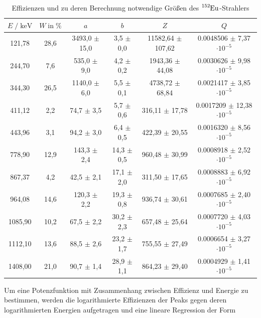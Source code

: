 \begin{table}
  \centering
  \caption{Effizienzen und zu deren Berechnung notwendige Größen des $\ce{^{152}Eu}$-Strahlers}
  \label{tab:mess2}
  \begin{tabular}{c c c c c c}
  \toprule
  $E \;/\; \si{\kilo\eV}$ & $W \;\text{in}\; \si{\percent}$ & $a$ & $b$ & $Z$ & $Q$ \\
  \midrule
        121,78 & 28,6 & 3493,0 $\pm$ 15,0 &  3,5 $\pm$ 0,0 & 11582,64 $\pm$ 107,62 & 0.0048506 $\pm$  7,37 $\cdot 10^{-5}$ \\
        244,70 &  7,6 &  535,0 $\pm$  9,0 &  4,2 $\pm$ 0,2 &  1943,36 $\pm$  44,08 & 0.0030626 $\pm$  9,98 $\cdot 10^{-5}$ \\
        344,30 & 26,5 & 1140,0 $\pm$  6,0 &  5,5 $\pm$ 0,1 &  4738,72 $\pm$  68,84 & 0.0021417 $\pm$  3,85 $\cdot 10^{-5}$ \\
        411,12 &  2,2 &   74,7 $\pm$  3,5 &  5,7 $\pm$ 0,6 &   316,11 $\pm$  17,78 & 0.0017209 $\pm$ 12,38 $\cdot 10^{-5}$ \\
        443,96 &  3,1 &   94,2 $\pm$  3,0 &  6,4 $\pm$ 0,5 &   422,39 $\pm$  20,55 & 0.0016320 $\pm$  8,56 $\cdot 10^{-5}$ \\
        778,90 & 12,9 &  143,3 $\pm$  2,4 & 14,3 $\pm$ 0,5 &   960,48 $\pm$  30,99 & 0.0008918 $\pm$  2,52 $\cdot 10^{-5}$ \\
        867,37 &  4,2 &   42,5 $\pm$  2,1 & 17,1 $\pm$ 2,0 &   311,50 $\pm$  17,65 & 0.0008883 $\pm$  6,92 $\cdot 10^{-5}$ \\
        964,08 & 14,6 &  120,3 $\pm$  2,2 & 19,3 $\pm$ 0,8 &   936,74 $\pm$  30,61 & 0.0007685 $\pm$  2,40 $\cdot 10^{-5}$ \\
       1085,90 & 10,2 &   67,5 $\pm$  2,2 & 30,2 $\pm$ 2,3 &   657,48 $\pm$  25,64 & 0.0007720 $\pm$  4,03 $\cdot 10^{-5}$ \\
       1112,10 & 13,6 &   88,5 $\pm$  2,6 & 23,2 $\pm$ 1,7 &   755,55 $\pm$  27,49 & 0.0006654 $\pm$  3,27 $\cdot 10^{-5}$ \\
       1408,00 & 21,0 &   90,7 $\pm$  1,4 & 28,9 $\pm$ 1,1 &   864,23 $\pm$  29,40 & 0.0004929 $\pm$  1,41 $\cdot 10^{-5}$ \\
  \bottomrule
  \end{tabular}
  \end{table}

Um eine Potenzfunktion mit Zusammenhang zwischen Effizienz und Energie zu bestimmen,
werden die logarithmierte Effizienzen der Peaks gegen deren logarithmierten Energien aufgetragen und eine
lineare Regression der Form

